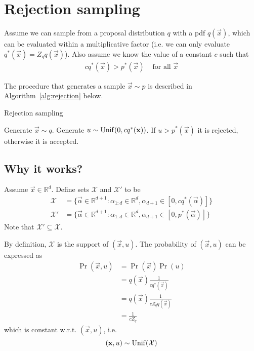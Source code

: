 \section{Rejection sampling}

Assume we can sample from a proposal distribution $q$ with a pdf $q(\vec x)$, which can be evaluated within a multiplicative factor (i.e. we can only evaluate $q^\ast(\vec x) = Z_q q(\vec x)$). Also assume we know the value of a constant $c$ such that
\begin{align}
    c q^\ast(\vec x) > p^\ast(\vec x) & \text{ for all } \vec x
\end{align}

The procedure that generates a sample $\vec x \sim p$ is described in Algorithm~\ref{alg:rejection} below.
\begin{algorithm}
\caption{Rejection sampling}\label{alg:rejection}
    \begin{algorithmic}[1]
        \State Generate $\vec x \sim q$.
        \State Generate $u \sim \operatorname{Unif}(0, c q^\ast(\boldsymbol{\mathbf{x}}))$.
        \State If $u > p^\ast(\vec x)$ it is rejected, otherwise it is accepted.
    \end{algorithmic}
\end{algorithm}


\subsection{Why it works?}
    Assume $\vec x \in \mathbb R^d$. Define sets $\mathcal X$ and $\mathcal X'$ to be
    \begin{align}
        \mathcal X &= \{\vec \alpha \in \mathbb R^{d + 1}: \alpha_{1:d} \in \mathbb R^d, \alpha_{d + 1} \in [0, c q^\ast(\vec \alpha)]\} \\
        \mathcal X' &= \{\vec \alpha \in \mathbb R^{d + 1}: \alpha_{1:d} \in \mathbb R^d, \alpha_{d + 1} \in [0, p^\ast(\vec \alpha)]\}
    \end{align}
    Note that $\mathcal X' \subseteq \mathcal X$.

    By definition, $\mathcal X$ is the support of $(\vec x, u)$. The probability of $(\vec x, u)$ can be expressed as
    \begin{align}
        \Pr(\vec x, u)  &= \Pr(\vec x) \Pr(u) \\
                        &= q(\vec x) \frac{1}{c q^\ast(\vec x)} \\
                        &= q(\vec x) \frac{1}{c Z_q q(\vec x)} \\
                        &= \frac{1}{c Z_q}
    \end{align}
    which is constant w.r.t. $(\vec x, u)$, i.e.
    \begin{equation}
        (\boldsymbol{\mathbf{x}}, u) \sim \operatorname{Unif}(\mathcal X)
    \end{equation}

